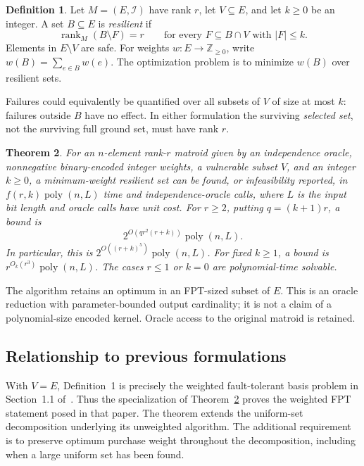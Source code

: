 \documentclass[11pt]{article}
\newtheorem{theorem}{Theorem}
\theoremstyle{definition}\newtheorem{definition}[theorem]{Definition}
\theoremstyle{remark}\newtheorem{remark}[theorem]{Remark}
\DeclareMathOperator{\rk}{rank}
\begin{document}
\begin{definition}
Let $M=(E,\mathcal I)$ have rank $r$, let $V\subseteq E$, and let $k\geq0$ be an integer. A set $B\subseteq E$ is \emph{resilient} if
\begin{equation}\label{eq:resilience}
 \rk_M(B\setminus F)=r\qquad\text{for every }F\subseteq B\cap V\text{ with }|F|\leq k.
\end{equation}
Elements in $E\setminus V$ are safe. For weights $w:E\to\mathbb Z_{\geq0}$, write $w(B)=\sum_{e\in B}w(e)$. The optimization problem is to minimize $w(B)$ over resilient sets.
\end{definition}

Failures could equivalently be quantified over all subsets of $V$ of size at most $k$: failures outside $B$ have no effect. In either formulation the surviving \emph{selected set}, not the surviving full ground set, must have rank $r$.

\begin{theorem}\label{thm:main}
For an $n$-element rank-$r$ matroid given by an independence oracle, nonnegative binary-encoded integer weights, a vulnerable subset $V$, and an integer $k\geq0$, a minimum-weight resilient set can be found, or infeasibility reported, in $f(r,k)\operatorname{poly}(n,L)$ time and independence-oracle calls, where $L$ is the input bit length and oracle calls have unit cost. For $r\geq2$, putting $q=(k+1)r$, a bound is
\[
 2^{O(qr^2(r+k))}\operatorname{poly}(n,L).
\]
In particular, this is $2^{O((r+k)^5)}\operatorname{poly}(n,L)$. For fixed $k\geq1$, a bound is $r^{O_k(r^3)}\operatorname{poly}(n,L)$. The cases $r\leq1$ or $k=0$ are polynomial-time solvable.
\end{theorem}

The algorithm retains an optimum in an FPT-sized subset of $E$. This is an oracle reduction with parameter-bounded output cardinality; it is not a claim of a polynomial-size encoded kernel. Oracle access to the original matroid is retained.

\subsection{Relationship to previous formulations}
With $V=E$, Definition~1 is precisely the weighted fault-tolerant basis problem in Section~1.1 of~\cite{BFGL}. Thus the specialization of Theorem~\ref{thm:main} proves the weighted FPT statement posed in that paper. The theorem extends the uniform-set decomposition underlying its unweighted algorithm. The additional requirement is to preserve optimum purchase weight throughout the decomposition, including when a large uniform set has been found.
\end{document}
